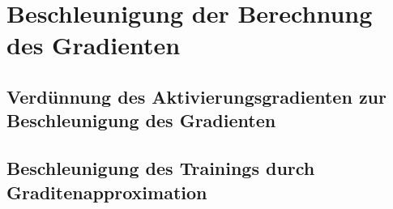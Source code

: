 \chapter{Beschleunigung der Berechnung des Gradienten}


\section{Verdünnung des Aktivierungsgradienten zur Beschleunigung des Gradienten}



\section{Beschleunigung des Trainings durch Graditenapproximation}

